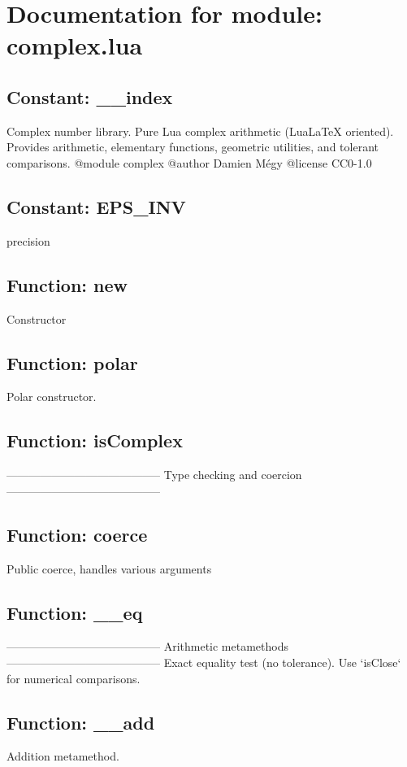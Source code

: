 \documentclass{article}
\begin{document}
\section*{Documentation for module: complex.lua}
\subsection*{Constant: \_\_index}
Complex number library. Pure Lua complex arithmetic (LuaLaTeX oriented). Provides arithmetic, elementary functions, geometric utilities, and tolerant comparisons.  @module complex @author Damien Mégy @license CC0-1.0
\hrulefill

\subsection*{Constant: EPS\_INV}
precision
\hrulefill

\subsection*{Function: new}
Constructor 
\hrulefill

\subsection*{Function: polar}
Polar constructor.
\hrulefill

\subsection*{Function: isComplex}
----------------------------------------- Type checking and coercion -----------------------------------------
\hrulefill

\subsection*{Function: coerce}
Public coerce, handles various arguments
\hrulefill

\subsection*{Function: \_\_eq}
----------------------------------------- Arithmetic metamethods ----------------------------------------- Exact equality test (no tolerance). Use `isClose` for numerical comparisons.
\hrulefill

\subsection*{Function: \_\_add}
Addition metamethod.
\hrulefill
\end{document}
